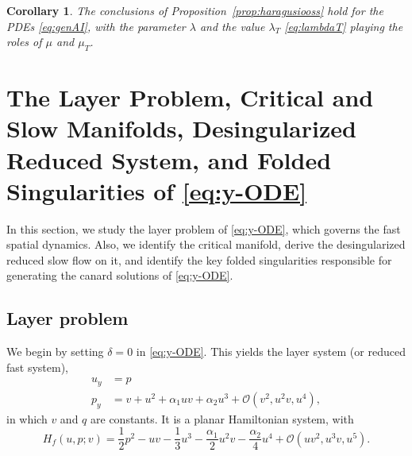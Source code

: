 \documentclass[11pt]{article}
\numberwithin{equation}{section}
\newtheorem{corollary}{Corollary}[section]
\begin{document}
\begin{corollary}\label{eq:corllary2.1}
The conclusions of Proposition~\ref{prop:haragusiooss} hold for the PDEs \eqref{eq:genAI}, with the parameter $\lambda$
and the value $\lambda_T$ \eqref{eq:lambdaT} playing 
the roles of $\mu$ and $\mu_T$.
\end{corollary}


\section{The Layer Problem, Critical and Slow Manifolds, Desingularized Reduced System, and Folded Singularities of \texorpdfstring{\eqref{eq:y-ODE}}{Lg}}
\label{sec:layerproblem+criticalmanifold+desingularizedsystem}

In this section, we study the layer problem of \eqref{eq:y-ODE}, which governs the fast spatial dynamics.
Also, we identify the critical manifold, derive the desingularized reduced slow flow on it, and identify the key folded singularities responsible for generating the canard solutions of \eqref{eq:y-ODE}.

\subsection{Layer problem}\label{sec:layerprob}

We begin by setting $\delta=0$ in \eqref{eq:y-ODE}.
This yields the layer system (or reduced fast system),
\begin{equation} \label{layer}
\begin{split}
    u_y &= p \\
    p_y &= v + u^2 + \alpha_1 uv + \alpha_2 u^3 + \mathcal{O}(v^2,u^2v,u^4),
\end{split}
\end{equation}
in which $v$ and $q$ are constants.
It is a planar Hamiltonian system, with
\begin{equation}\label{H_f}
H_f (u,p;v) = \frac{1}{2} p^2 - uv - \frac{1}{3} u^3 
-\frac{\alpha_1}{2} u^2v - \frac{\alpha_2}{4} u^4  
+ \mathcal{O}(uv^2, u^3v, u^5).
\end{equation}
\end{document}

